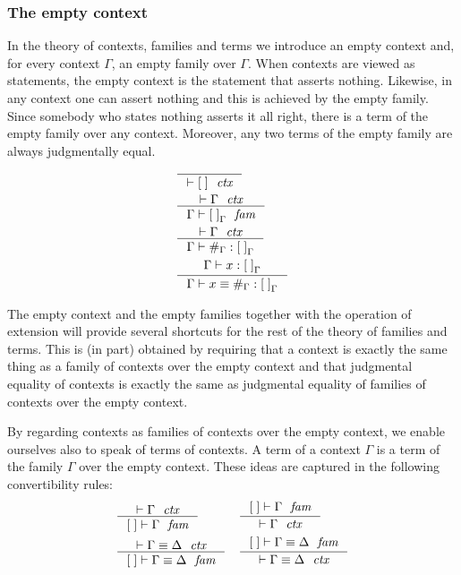\subsubsection{The empty context}
\label{empty}
In the theory of contexts, families and terms we introduce an empty context and,
for every context $\Gamma$, an empty family over $\Gamma$. 
When contexts are viewed as statements, the empty context is the statement that
asserts nothing. Likewise, in any context one can assert nothing and this is
achieved by the empty family. 
Since somebody who states nothing asserts it all right, there is a term of the empty
family over any context. Moreover, any two terms of the empty family are always
judgmentally equal.
\begin{align}
& \inference
  { }
  { \jctx{\emptyc}
    }
  \\
& \inference
  { \jctx{\Gamma}
    }
  { \jfam{\Gamma}{\emptyf[\Gamma]}
    }
  \\
& \inference
  { \jctx{\Gamma}
    }
  { \jterm{\Gamma}{\emptyf[\Gamma]}{\emptytm[\Gamma]}
    }
  \\
& \inference
  { \jterm{\Gamma}{\emptyf[\Gamma]}{x}
    }
  { \jtermeq
      {\Gamma}
      {\emptyf[\Gamma]}
      {x}
      {\emptytm[\Gamma]}
    }
\end{align}

The empty context and the empty families together with the operation of
extension will provide several shortcuts for the rest
of the theory of families and terms. This is (in part) obtained by requiring
that a context is exactly the same thing as a family of contexts over the
empty context and that judgmental equality of contexts is exactly the same
as judgmental equality of families of contexts over the empty context. 

By regarding contexts as families of contexts over the empty context, we
enable ourselves also to speak of terms of contexts. A term of a context
$\Gamma$ is a term of the family $\Gamma$ over the empty context. These ideas
are captured in the following convertibility rules:
\begin{align}
& \inference
  { \jctx{\Gamma}
    }
  { \jfam{\emptyc}{\Gamma}
    } 
& & \inference
    { \jfam{\emptyc}{\Gamma}
      }
    { \jctx{\Gamma}
      }
    \\
& \inference
  { \jctxeq{\Gamma}{\Delta}
    }
  { \jfameq{\emptyc}{\Gamma}{\Delta}
    }
& & \inference
    { \jfameq{\emptyc}{\Gamma}{\Delta}
      }
    { \jctxeq{\Gamma}{\Delta}
      }
\end{align}

